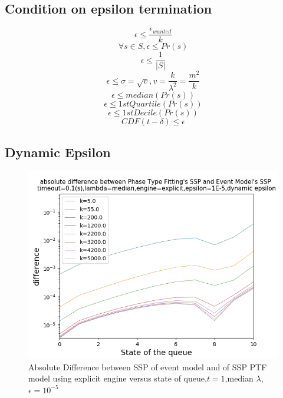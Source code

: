 \documentclass[paper=a4, fontsize=11pt]{scrartcl}
\numberwithin{equation}{section}		%
\numberwithin{figure}{section}			%
\numberwithin{table}{section}				%
\begin{document}
\clearpage
\subsection[epsilon termination]{Condition on epsilon termination}
$$\epsilon \leq \frac{\epsilon_{wanted}}{k}$$
$$\forall s \in S, \epsilon \leq Pr(s)$$
$$\epsilon \leq \frac{1}{|S|}$$
$$\epsilon \leq \sigma = \sqrt{v}, v = \frac{k}{\lambda^2} = \frac{m^2}{k}$$
$$\epsilon \leq median(Pr(s))$$
$$\epsilon \leq 1stQuartile(Pr(s))$$
$$\epsilon \leq 1stDecile(Pr(s))$$
$$CDF(t-\delta) \leq \epsilon$$

\clearpage
\subsection[epsilon termination]{Dynamic Epsilon}


\begin{figure}
	\centering
	\includegraphics[width=17cm]{picture/New_model/diff_explicit_dynamic.png}
	\caption{Absolute Difference between SSP of event model and of SSP PTF model using explicit engine versus state of queue,$t=1$,median $\lambda$,$\epsilon=10^{-5}$}
	\label{fig:dist_dynamic_explicit}
\end{figure}	
\end{document}
